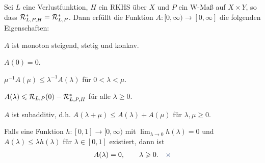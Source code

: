 \begin{lem}
\label{prop:6.3.3}
Sei $L$ eine Verlustfunktion, $H$ ein RKHS über $X$ und $P$ ein W-Maß auf
$X\times Y$, so dass $\mathcal{R}_{L,P,H}^* = \mathcal{R}_{L,P}^*$. Dann erfüllt die Funktion
$A: [0,\infty)\to [0,\infty]$ die folgenden Eigenschaften:
\begin{equivenum}
\item\label{prop:6.3.3:1} $A$ ist monoton steigend, stetig und konkav.
\item\label{prop:6.3.3:2} $A(0) = 0$.
\item\label{prop:6.3.3:3} $\mu^{-1}A(\mu)\le \lambda^{-1}A(\lambda)$ für $0 <
\lambda < \mu$.
\item\label{prop:6.3.3:4} $A(\lambda)\leqslant \mathcal{R}_{L,P}(0)-\mathcal{R}_{L,P,H}^*$ für alle
$\lambda \ge 0$.
\item\label{prop:6.3.3:5} $A$ ist subadditiv, d.h. $A(\lambda + \mu) \le
A(\lambda) + A(\mu)$ für $\lambda,\mu\ge 0$.
\item\label{prop:6.3.3:6} Falls eine Funktion $h:[0,1]\to [0,\infty)$ mit
$\lim_{\lambda\to 0} h(\lambda) = 0$ und $A(\lambda)\le \lambda h(\lambda)$ für $\lambda\in[0,1]$
existiert, dann ist
\begin{align*}
A(\lambda) = 0,\qquad \lambda \ge 0.\fishhere
\end{align*}
\end{equivenum}
\end{lem}

